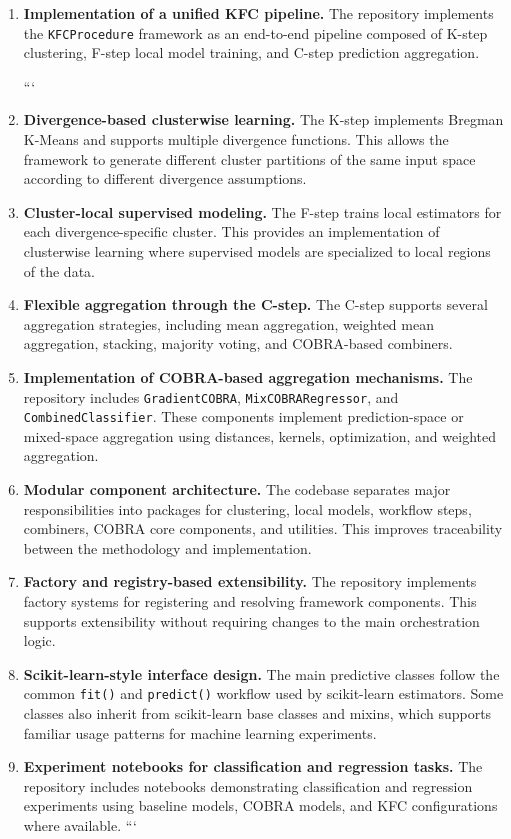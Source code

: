 \begin{enumerate}
\item \textbf{Implementation of a unified KFC pipeline.}
The repository implements the \texttt{KFCProcedure} framework as an end-to-end pipeline composed of K-step clustering, F-step local model training, and C-step prediction aggregation.

```
\item \textbf{Divergence-based clusterwise learning.}  
The K-step implements Bregman K-Means and supports multiple divergence functions. This allows the framework to generate different cluster partitions of the same input space according to different divergence assumptions.

\item \textbf{Cluster-local supervised modeling.}  
The F-step trains local estimators for each divergence-specific cluster. This provides an implementation of clusterwise learning where supervised models are specialized to local regions of the data.

\item \textbf{Flexible aggregation through the C-step.}  
The C-step supports several aggregation strategies, including mean aggregation, weighted mean aggregation, stacking, majority voting, and COBRA-based combiners.

\item \textbf{Implementation of COBRA-based aggregation mechanisms.}  
The repository includes \texttt{GradientCOBRA}, \texttt{MixCOBRARegressor}, and \texttt{CombinedClassifier}. These components implement prediction-space or mixed-space aggregation using distances, kernels, optimization, and weighted aggregation.

\item \textbf{Modular component architecture.}  
The codebase separates major responsibilities into packages for clustering, local models, workflow steps, combiners, COBRA core components, and utilities. This improves traceability between the methodology and implementation.

\item \textbf{Factory and registry-based extensibility.}  
The repository implements factory systems for registering and resolving framework components. This supports extensibility without requiring changes to the main orchestration logic.

\item \textbf{Scikit-learn-style interface design.}  
The main predictive classes follow the common \texttt{fit()} and \texttt{predict()} workflow used by scikit-learn estimators. Some classes also inherit from scikit-learn base classes and mixins, which supports familiar usage patterns for machine learning experiments.

\item \textbf{Experiment notebooks for classification and regression tasks.}  
The repository includes notebooks demonstrating classification and regression experiments using baseline models, COBRA models, and KFC configurations where available.
```

\end{enumerate}


